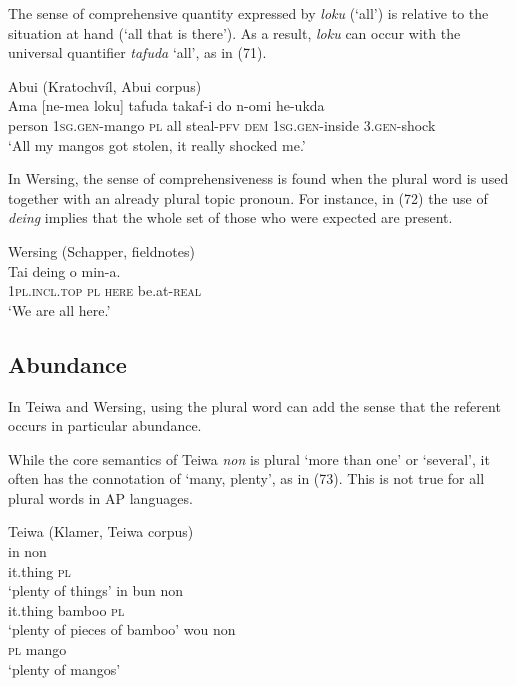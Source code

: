 The sense of comprehensive quantity expressed by \textit{loku} (`all') is relative to the situation at hand (`all that is there'). As a result, \textit{loku} can occur with the universal quantifier \textit{tafuda} `all', as in (71).



\ea%
\label{ex:71}
Abui (Kratochv\'il, Abui corpus)\\
\gll  Ama [ne-mea loku] tafuda takaf-i  do n-omi he-ukda \\
    person \textsc{1sg.gen-}mango \textsc{pl} all steal-\textsc{pfv}  \textsc{dem} \textsc{1sg.gen-}inside 3.\textsc{gen-}shock \\
\glt `All my mangos got stolen,  it really shocked me.' %
\z












In Wersing, the sense of comprehensiveness is found when the plural word is used together with an already plural topic pronoun. For instance, in (72) the use of \textit{deing} implies that the whole set of those who were expected are present.


\ea%
\label{ex:72}
Wersing  (Schapper, fieldnotes)\\
\gll Tai deing o min-a.  \\
   \textsc{1pl.incl.top} \textsc{pl}   \textsc{here} be.at-\textsc{real}  \\
\glt `We are all here.'
\z






\subsection{Abundance} %
In Teiwa and Wersing, using the plural word can add the sense that the referent occurs in particular abundance.

While the core semantics of Teiwa \textit{non} is plural `more than one' or `several', it often has the connotation of `many, plenty', as in (73). This is not true for all plural words in AP languages.


\ea%
\label{ex:73}
Teiwa (Klamer, Teiwa corpus)\\
\ea
\gll  in  non\\
   it.thing  \textsc{pl} \\
   \glt `plenty of things'
\ex
\gll in  bun non \\
it.thing bamboo \textsc{pl} \\
\glt `plenty of pieces of bamboo'
\ex
\gll wou  non\\
\textsc{pl} mango\\
\glt  `plenty of mangos'
\z
\z

